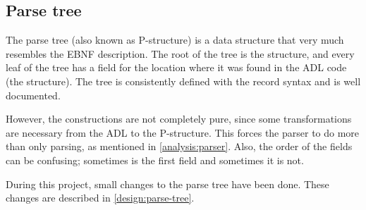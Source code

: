 
\subsection{Parse tree}
\label{analysis:parse-tree}
The parse tree (also known as P-structure) is a data structure that very much resembles the EBNF description.
The root of the tree is the  structure, and every leaf of the tree has a field for the location where it was found in the ADL code (the  structure).
The tree is consistently defined with the record syntax and is well documented.

However, the constructions are not completely pure, since some transformations are necessary from the ADL to the P-structure.
This forces the parser to do more than only parsing, as mentioned in \autoref{analysis:parser}.
Also, the order of the fields can be confusing; sometimes  is the first field and sometimes it is not.

During this project, small changes to the parse tree have been done.
These changes are described in \autoref{design:parse-tree}.
